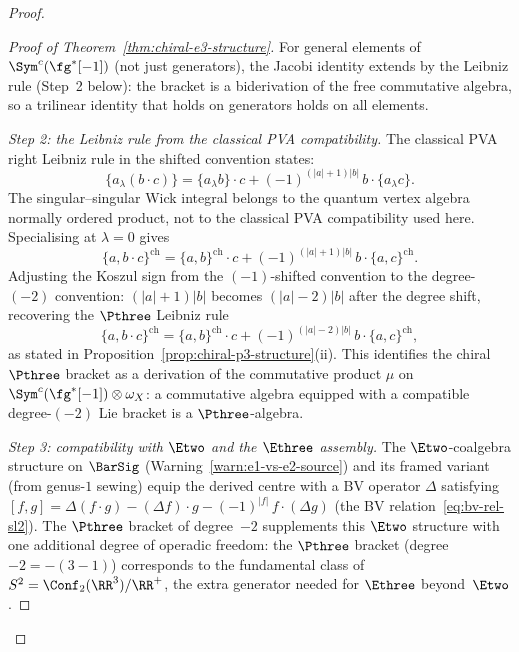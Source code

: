 \begin{proof}
\begin{proof}[Proof of Theorem~\ref{thm:chiral-e3-structure}]
For general elements of $\Sym^c(\fg^*[-1])$ (not just
generators), the Jacobi identity extends by the Leibniz
rule (Step~2 below): the bracket is a biderivation of the
free commutative algebra, so a trilinear identity that
holds on generators holds on all elements.

\textit{Step 2: the Leibniz rule from the classical PVA
compatibility.}
The classical PVA right Leibniz rule in the shifted convention
states:
\[
  \{a \mathbin{{}_\lambda} (b \cdot c)\}
  = \{a \mathbin{{}_\lambda} b\} \cdot c
  + (-1)^{(|a|+1)|b|}\,
  b \cdot \{a \mathbin{{}_\lambda} c\}.
\]
The singular--singular Wick integral belongs to the quantum vertex
algebra normally ordered product, not to the classical PVA
compatibility used here. Specialising at $\lambda = 0$ gives
\[
  \{a, b \cdot c\}^{\mathrm{ch}}
  = \{a, b\}^{\mathrm{ch}} \cdot c
  + (-1)^{(|a|+1)|b|}\,
  b \cdot \{a, c\}^{\mathrm{ch}}.
\]
Adjusting the Koszul sign from the $(-1)$-shifted
convention to the degree-$(-2)$ convention:
$(|a|+1)|b|$ becomes $(|a|-2)|b|$ after the degree shift,
recovering the $\Pthree$ Leibniz rule
\[
  \{a, b \cdot c\}^{\mathrm{ch}}
  = \{a, b\}^{\mathrm{ch}} \cdot c
  + (-1)^{(|a|-2)|b|}\,
  b \cdot \{a, c\}^{\mathrm{ch}},
\]
as stated in
Proposition~\ref{prop:chiral-p3-structure}(ii). This
identifies the chiral $\Pthree$ bracket as a derivation of
the commutative product
$\mu$ on $\Sym^c(\fg^*[-1]) \otimes \omega_X$: a
commutative algebra equipped with a compatible
degree-$(-2)$ Lie bracket is a $\Pthree$-algebra.

\textit{Step 3: compatibility with $\Etwo$ and the
$\Ethree$ assembly.}
The $\Etwo$-coalgebra structure on $\BarSig$
(Warning~\ref{warn:e1-vs-e2-source}) and its framed
variant (from genus-$1$ sewing) equip the derived centre
with a BV operator $\Delta$ satisfying
$[f, g] = \Delta(f \cdot g) - (\Delta f) \cdot g
- (-1)^{|f|}\,f \cdot (\Delta g)$
(the BV relation~\eqref{eq:bv-rel-sl2}).
The $\Pthree$ bracket of degree~$-2$ supplements
this $\Etwo$ structure with one additional degree of
operadic freedom:
the $\Pthree$ bracket
(degree $-2 = -(3-1)$) corresponds to the fundamental
class of $S^2 = \Conf_2(\RR^3)/\RR^+$, the extra
generator needed for $\Ethree$ beyond~$\Etwo$.


\end{proof}
\end{proof}
